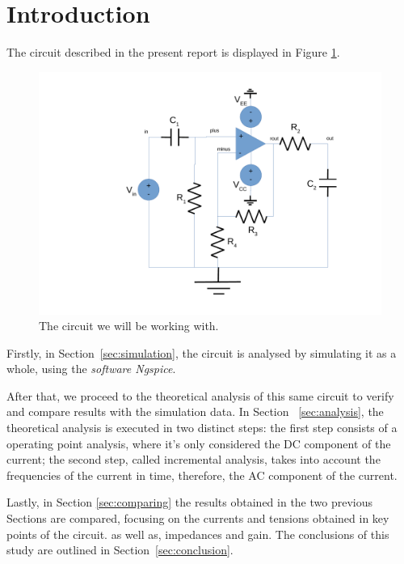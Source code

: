 \newpage
\section{Introduction}
\label{sec:introduction}



The circuit described in the present report is displayed in Figure \ref{fig:circuit}.

\begin{figure}[h] \centering
\includegraphics[width=0.7\linewidth]{circuit.pdf}
\caption{The circuit we will be working with.}
\label{fig:circuit}
\end{figure}


Firstly, in Section~\ref{sec:simulation}, the circuit is analysed by simulating it as a whole, using the \textit{software Ngspice}.

After that, we proceed to the theoretical analysis of this same circuit to verify and compare results with the simulation data. In Section ~\ref{sec:analysis}, the theoretical analysis is executed in two distinct steps: the first step consists of a operating point analysis, where it's only considered the DC component of the current; the second step, called incremental analysis, takes into account the frequencies of the current in time, therefore, the AC component of the current.

Lastly, in Section \ref{sec:comparing} the results obtained in the two previous Sections are compared, focusing on the currents and tensions obtained in key points of the circuit. as well as, impedances and gain.
The conclusions of this study are outlined in Section~\ref{sec:conclusion}.